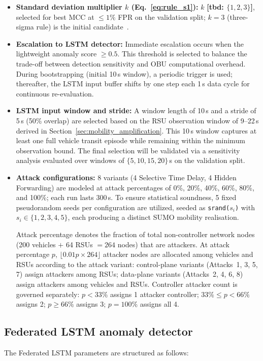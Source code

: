 \documentclass[12pt, a4paper]{report}
\begin{document}
{{\begin{itemize}
    \item \textbf{Standard deviation multiplier
    $k$ (Eq.~\ref{eq:rule_s1}):}
    $k$ \textbf{[tbd: $\{1, 2, 3\}$]}, selected
    for best MCC at $\leq 1\%$ FPR on the
    validation split; $k{=}3$ (three-sigma rule)
    is the initial candidate~\cite{pukelsheim1994three}.

    \item \textbf{Escalation to LSTM detector:} Immediate escalation occurs when the lightweight anomaly score $\geq 0.5$. This threshold is selected to balance the trade-off between detection sensitivity and OBU computational overhead. During bootstrapping (initial 10\,s window), a periodic trigger is used; thereafter, the LSTM input buffer shifts by one step each 1\,s data cycle for continuous re-evaluation.
    \item \textbf{LSTM input window and stride:} A window length of 10\,s and a stride of 5\,s (50\% overlap) are selected based on the RSU observation window of 9--22\,s derived in Section~\ref{sec:mobility_amplification}. This 10\,s window captures at least one full vehicle transit episode while remaining within the minimum observation bound. The final selection will be validated via a sensitivity analysis evaluated over windows of $\{5, 10, 15, 20\}$\,s on the validation split.
    \item \textbf{Attack configurations:} 8 variants (4 Selective Time Delay, 4 Hidden Forwarding) are modeled at attack percentages of 0\%, 20\%, 40\%, 60\%, 80\%, and 100\%; each run lasts 300\,s. To ensure statistical soundness, 5 fixed pseudorandom seeds per configuration are utilized, seeded as \texttt{srand($s_i$)} with $s_i \in \{1,2,3,4,5\}$, each producing a distinct SUMO mobility realisation.

    Attack percentage denotes the fraction of total
non-controller network nodes (200 vehicles $+$
64 RSUs $= 264$ nodes) that are attackers.
At attack percentage $p$,
$\lfloor 0.01p \times 264 \rfloor$ attacker nodes
are allocated among vehicles and RSUs according
to the attack variant: control-plane variants
(Attacks~1, 3, 5, 7) assign attackers among RSUs;
data-plane variants (Attacks~2, 4, 6, 8) assign
attackers among vehicles and RSUs.
Controller attacker count is governed separately:
$p < 33\%$ assigns 1 attacker controller;
$33\% \leq p < 66\%$ assigns 2;
$p \geq 66\%$ assigns 3; $p = 100\%$ assigns all 4.

\end{itemize}

\subsection{Federated LSTM anomaly detector}
\label{sec:fed_lstm}
The Federated LSTM parameters are structured as follows:

}}
\end{document}
